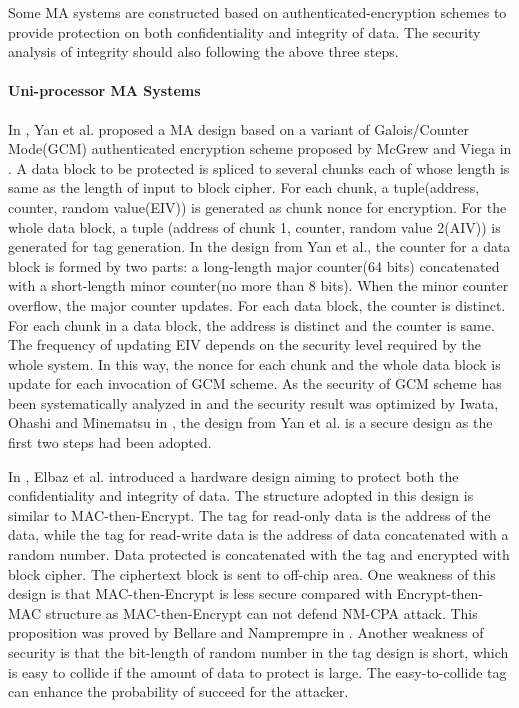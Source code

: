 \documentclass{article}
\begin{document}
Some MA systems are constructed based on authenticated-encryption schemes to
provide protection on both confidentiality and integrity of data. The security analysis of integrity should also following the above three steps. 
\paragraph{Uni-processor MA Systems}
In \cite{yan-MA}, Yan et al. proposed a MA design based on a variant of Galois/Counter Mode(GCM) authenticated encryption scheme proposed by McGrew and Viega in \cite{gcm}. A data block to be protected is spliced to several chunks each of whose length is same as the length of input to block cipher. For each chunk, a tuple(address, counter, random value(EIV)) is generated as chunk nonce for encryption. For the whole data block, a tuple (address of chunk 1, counter, random value 2(AIV)) is generated for tag generation. 
In the design from Yan et al., the counter for a data block is formed by two parts: a long-length major counter(64 bits) concatenated with a short-length minor counter(no more than 8 bits). When the minor counter overflow, the major counter updates. For each data block, the counter is distinct. For each chunk in a data block, the address is distinct and the counter is same. The frequency of updating EIV depends on the security level required by the whole system.  In this way, the nonce for each chunk and the whole data block is update for each invocation of GCM scheme. As the security of GCM scheme has been systematically analyzed in \cite{gcm} and the security result was optimized by Iwata, Ohashi and Minematsu in \cite{breaking}, the design from Yan et al. is a secure design as the first two steps had been adopted.


In \cite{pc-ice}, Elbaz et al. introduced a hardware design aiming to protect both the confidentiality and integrity of data. The structure adopted in this design is similar to MAC-then-Encrypt. The tag for read-only data is the address of the data, while the tag for read-write data is the address of data concatenated with a random number. Data protected is concatenated with the tag and encrypted with block cipher. The ciphertext block is sent to off-chip area.
One weakness of this design is that MAC-then-Encrypt is less secure compared with Encrypt-then-MAC structure as MAC-then-Encrypt can not defend NM-CPA attack. This proposition was proved by Bellare and Namprempre in \cite{ae-notion}.
Another weakness of security is that the bit-length of random number in the tag design is short, which is easy to collide if the amount of data to protect is large. The easy-to-collide tag can enhance the probability of succeed for the attacker.
\end{document}
